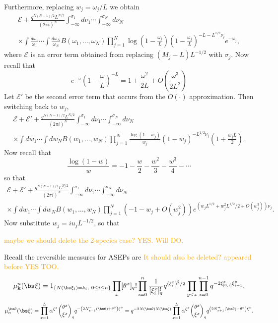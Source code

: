 Furthermore, replacing $w_j = \omega_j/L$ we obtain
\begin{multline*}
\mathcal{E}+\frac{q^{N(N-1)/2}L^{N/2}}{(2\pi i )^N} \int_{-\infty}^{\sigma_1 } d\nu_1 \cdots \int_{-\infty}^{\sigma_N} d\nu_N\\
\times \int \frac{d\omega_1}{\omega_1} \cdots \int \frac{d\omega_N}{\omega_N} B(\omega_1,\ldots,\omega_N) \prod_{j=1}^N \log(1-\frac{\omega_j}{L}) (1-\frac{\omega_j}{L})^{-L-L^{1/2}\nu_j} e^{-\omega_j  }   ,
\end{multline*}
where $\mathcal{E}$ is an error term obtained from replacing $(M_j-L)L^{-1/2}$ with $\sigma_j$. Now recall that
$$
e^{-\omega}\left( 1 - \frac{\omega}{L}\right)^{-L} = 1 +  \frac{\omega^2}{2L} + O \left(\frac{\omega^3}{2L^2}\right)
$$
Let $\mathcal{E}'$ be the second error term that occurs from the $O(\cdot)$ approximation. Then switching back to $w_j$, 
\begin{multline*}
\mathcal{E}+ \mathcal{E}'+\frac{q^{N(N-1)/2}L^{N/2}}{(2\pi i )^N} \int_{-\infty}^{\sigma_1 } d\nu_1 \cdots \int_{-\infty}^{\sigma_N} d\nu_N\\
\times \int dw_1 \cdots \int dw_N B(w_1,\ldots,w_N) \prod_{j=1}^N \frac{\log(1-w_j)}{w_j} (1-{w_j})^{-L^{1/2}\nu_j} \left( 1 + \frac{w_jL}{2} \right).
\end{multline*}
Now recall that
$$
\frac{\log(1-w)}{w} = -1 - \frac{w}{2} - \frac{w^2}{3} - \frac{w^3}{4} - \cdots 
$$
so that
\begin{multline*}
\mathcal{E}+ \mathcal{E}'+\frac{q^{N(N-1)/2}L^{N/2}}{(2\pi i )^N} \int_{-\infty}^{\sigma_1 } d\nu_1 \cdots \int_{-\infty}^{\sigma_N} d\nu_N\\
\times \int dw_1 \cdots \int dw_N B(w_1,\ldots,w_N) \prod_{j=1}^N (-1-w_j+O(w_j^2))  e^{(w_jL^{1/2}+w_j^2L^{1/2}/2+O(w_j^3))\nu_j} .
\end{multline*} 
Now substitute $w_j = iu_jL^{-1/2}$, so that 




\textcolor{orange}{maybe we should delete the 2-species case? YES. Will DO.}

Recall the reversible measures for ASEPs  are \textcolor{orange}{It should also be deleted? appeared before YES TOO.}
\begin{equation}
    \mu_{\mathbf{k}}^n(\bs\xi)=1_{\{N(\bs\xi_i)=k_i,\ 0\le i\le n\}} \prod_x[\theta^x]_q!\prod_{i=0}^{n}\frac{1}{[\xi_i^x]^!_q}q^{(\xi_i^x)^2/2}\prod_{y<x}\prod_{i=0}^{n-1}q^{-2\xi^x_{[0,i]}\xi^y_{i+1}},
\end{equation}
\begin{equation}
    \mu_\alpha^{\bs\theta}(\bs\xi)=\prod_{x=1}^L \alpha^{\xi^x}\binom{\theta^x}{\xi^x}_qq^{-\left(2N^-_{x-1}(\bs\theta)+\theta^x\right)\xi^x}\\
    =q^{-2N(\bs\theta)N(\bs\xi)}\prod_{x=1}^L \alpha^{\xi^x}\binom{\theta^x}{\xi^x}_qq^{\left(2N^+_{x+1}(\bs\theta)+\theta^x\right)\xi^x}.
\end{equation}

